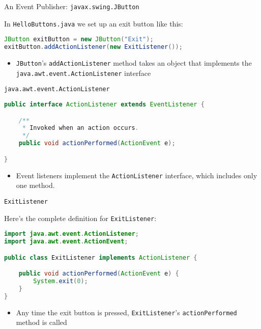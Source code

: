 \documentclass{beamer}
\begin{document}
\begin{frame}[fragile]{An Event Publisher: {\tt javax.swing.JButton}}


In {\tt HelloButtons.java} we set up an exit button like this: 
\begin{lstlisting}[language=Java]
JButton exitButton = new JButton("Exit");
exitButton.addActionListener(new ExitListener());
\end{lstlisting}

\begin{itemize}
\item {\tt JButton}'s {\tt addActionListener} method takes an object that implements the {\tt java.awt.event.ActionListener} interface 
\end{itemize}


\end{frame}

\begin{frame}[fragile]{{\tt java.awt.event.ActionListener}}


\begin{lstlisting}[language=Java]
public interface ActionListener extends EventListener {

    /**
     * Invoked when an action occurs.
     */
    public void actionPerformed(ActionEvent e);

}
\end{lstlisting}

\begin{itemize}
\item Event listeners implement the {\tt ActionListener} interface, which includes only one method.
\end{itemize}


\end{frame}

\begin{frame}[fragile]{{\tt ExitListener}}


Here's the complete definition for {\tt ExitListener}:
\begin{lstlisting}[language=Java]
import java.awt.event.ActionListener;
import java.awt.event.ActionEvent;

public class ExitListener implements ActionListener {

    public void actionPerformed(ActionEvent e) {
        System.exit(0);
    }
}
\end{lstlisting}

\begin{itemize}
\item Any time the exit button is pressed, {\tt ExitListener}'s {\tt actionPerformed} method is called 
\end{itemize}


\end{frame}
\end{document}
